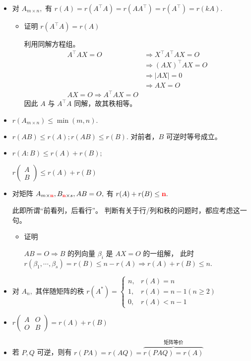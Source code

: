 \begin{itemize}
    \item 对 $ A_{m\times n}, $ 有 $ r(A) = r(A^\top A) = r(AA^\top) = r(A^\top) = r(kA). $
    \begin{itemize}
        \item 证明 $ r(A^\top A) = r(A) $ 
        
        利用同解方程组。
        \begin{equation*}
            \begin{aligned}
                A^\top AX = O &\Rightarrow X^\top A^\top AX = O \\ 
                &\Rightarrow (AX)^\top AX = O \\ &\Rightarrow |AX| = 0
                \\ &\Rightarrow AX = O \\ 
                AX = O \Rightarrow A^\top AX = O
            \end{aligned}
        \end{equation*}
        因此 $ A $ 与 $ A^\top A $ 同解，故其秩相等。
    \end{itemize} 
    \item $ r(A_{m\times n})\leq \min(m,n). $ 
    \item $ r(AB) \leq r(A); r(AB) \leq r(B). $ 对前者，$ B $ 可逆时等号成立。
    \item $ r(A:B)\leq r(A) + r(B); $ 
    
    $ r(\begin{matrix}
        A \\ B 
    \end{matrix}) \leq r(A) + r(B)$ 
    \item 对矩阵 $ A_{m\times \textcolor{red}{\bf{n}}},B_{\textcolor{red}{\bf{n}}\times s}, AB=O, $
    有 $ r(A) + r(B) \leq \textcolor{red}{\bf{n}}. $ 
    
    此即所谓“前看列，后看行”。
    判断有关于行/列和秩的问题时，都应考虑这一句。
    \begin{itemize}
        \item 证明
        
        $AB = O \Rightarrow B $ 的列向量 $ \beta_i $ 是 $ AX=O $ 的一组解，
        此时 $ r(\beta_1,\cdots,\beta_s) = r(B) \leq n - r(A) \Rightarrow r(A) + r(B) \leq n. $ 
    \end{itemize}
    \item 对 $ A_n, $ 其伴随矩阵的秩
    $ r(A^*)=\begin{cases}
        n,& r(A) = n\\ 1,&r(A) = n-1(n\geq 2)\\ 0,& r(A)< n-1
    \end{cases} $
    \item $ r\begin{pmatrix}
        A & O \\ O & B
    \end{pmatrix} = r(A) + r(B)$ 
    \item 若 $ P,Q $ 可逆，则有
    $ r(PA) = r(AQ) = \overbrace{r(PAQ) = r(A)}^{\textrm{矩阵等价}} $ 
    

\end{itemize}

